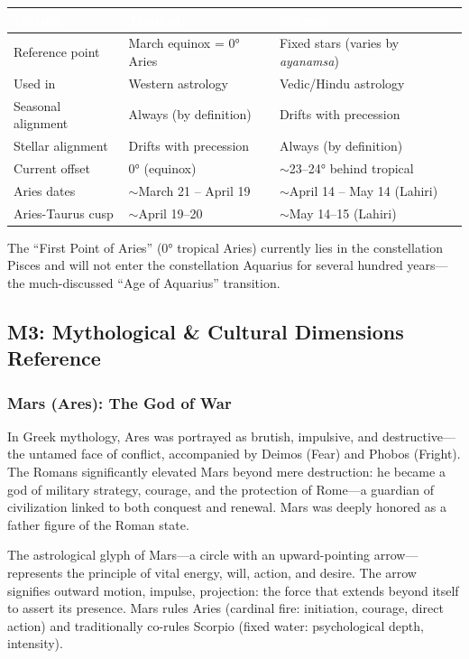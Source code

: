 \documentclass[11pt,letterpaper]{article}
\newcommand{\tableheader}[1]{\textbf{\sffamily\textcolor{white}{#1}}}
\begin{document}
\begin{center}
\begin{tabularx}{\textwidth}{L{3cm}XX}
\toprule
{}
\tableheader{Feature} & \tableheader{Tropical} & \tableheader{Sidereal} \\
\midrule
Reference point & March equinox = 0° Aries & Fixed stars (varies by \textit{ayanamsa}) \\
Used in & Western astrology & Vedic/Hindu astrology \\
Seasonal alignment & Always (by definition) & Drifts with precession \\
Stellar alignment & Drifts with precession & Always (by definition) \\
Current offset & 0° (equinox) & $\sim$23--24° behind tropical \\
Aries dates & $\sim$March 21 -- April 19 & $\sim$April 14 -- May 14 (Lahiri) \\
Aries-Taurus cusp & $\sim$April 19--20 & $\sim$May 14--15 (Lahiri) \\
\bottomrule
\end{tabularx}
\end{center}

The ``First Point of Aries'' (0° tropical Aries) currently lies in the constellation Pisces and will not enter the constellation Aquarius for several hundred years---the much-discussed ``Age of Aquarius'' transition.

\subsection{M3: Mythological \& Cultural Dimensions Reference}

\subsubsection{Mars (Ares): The God of War}

In Greek mythology, Ares was portrayed as brutish, impulsive, and destructive---the untamed face of conflict, accompanied by Deimos (Fear) and Phobos (Fright). The Romans significantly elevated Mars beyond mere destruction: he became a god of military strategy, courage, and the protection of Rome---a guardian of civilization linked to both conquest and renewal. Mars was deeply honored as a father figure of the Roman state.

The astrological glyph of Mars---a circle with an upward-pointing arrow---represents the principle of vital energy, will, action, and desire. The arrow signifies outward motion, impulse, projection: the force that extends beyond itself to assert its presence. Mars rules Aries (cardinal fire: initiation, courage, direct action) and traditionally co-rules Scorpio (fixed water: psychological depth, intensity).
\end{document}

